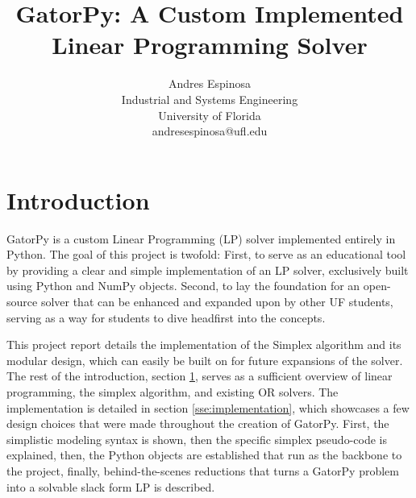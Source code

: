 \documentclass[conference]{IEEEtran}
\begin{document}
\title{GatorPy: A Custom Implemented Linear Programming Solver}

\author{
    \begin{minipage}{0.50\textwidth}
        \centering
        \textcolor{uf_blue}{Andres Espinosa} \\
        \textcolor{uf_orange}{Industrial and Systems Engineering} \\
        \textcolor{uf_orange}{University of Florida} \\
        \textcolor{uf_orange}{andresespinosa@ufl.edu} \\ 
    \end{minipage}
}


\maketitle


\begin{abstract}

\end{abstract}

\IEEEpeerreviewmaketitle

\section{Introduction}
\label{sse:introduction}
GatorPy is a custom Linear Programming (LP) solver implemented entirely in Python. The goal of this project is twofold: First, to serve as an educational tool by providing a clear and simple implementation of an LP solver, exclusively built using Python and NumPy objects. 
Second, to lay the foundation for an open-source solver that can be enhanced and expanded upon by other UF students, serving as a way for students to dive headfirst into the concepts.

This project report details the implementation of the Simplex algorithm and its modular design, which can easily be built on for future expansions of the solver.
The rest of the introduction, section \ref{sse:introduction}, serves as a sufficient overview of linear programming, the simplex algorithm, and existing OR solvers.
The implementation is detailed in section \ref{sse:implementation}, which showcases a few design choices that were made throughout the creation of GatorPy.
First, the simplistic modeling syntax is shown, then the specific simplex pseudo-code is explained, then, the Python objects are established that run as the backbone to the project, finally, behind-the-scenes reductions that turns a GatorPy problem into a solvable slack form LP is described.
\end{document}
